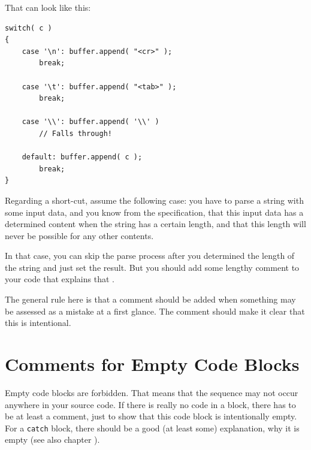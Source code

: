 That can look like this:
\begin{lstlisting}
switch( c )
{
    case '\n': buffer.append( "<cr>" );
        break;
        
    case '\t': buffer.append( "<tab>" );
        break;
        
    case '\\': buffer.append( '\\' )
        // Falls through!

    default: buffer.append( c );
        break;
}
\end{lstlisting}

Regarding a short-cut, assume the following case: you have to parse a string with some input data, and you know from the specification, that this input data has a determined content when the string has a certain length, and that this length will never be possible for any other contents.

In that case, you can skip the parse process after you determined the length of the string and just set the result. But you should add some lengthy comment to your code that explains that .

The general rule here is that a comment should be added when something may be assessed as a mistake at a first glance. The comment should make it clear that this  is intentional.


\section{Comments for Empty Code Blocks}\label{sec:CommentsForEmptyCodeBlocks}
Empty code blocks are forbidden. That means that the sequence \bdq{\lstinline|\{\}|} may not occur anywhere in your source code. If there is really no code in a block, there has to be at least a comment, just to show that this code block is intentionally empty. For a \lstinline|catch| block, there should be a good (at least some) explanation, why it is empty (see also chapter ).

